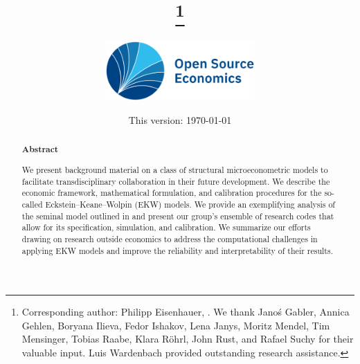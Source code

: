 
\begin{titlepage}

\title{%
	\sffamily\bfseries%
	\papertitle%
	\thanks{Corresponding author: Philipp Eisenhauer, . We thank Jano\'s Gabler, Annica Gehlen, Boryana Ilieva, Fedor Ishakov, Lena Janys, Moritz Mendel, Tim Mensinger, Tobias Raabe, Klara R\"ohrl, John Rust, and Rafael Suchy for their valuable input. Luis Wardenbach provided outstanding research assistance.}
}

\author{%
	\bigskip%
	\includegraphics[height=2.25cm]{../material/OSE_logo_RGB.pdf}%
	\bigskip%
}

\date{%
	\normalsize%
	This version: \today%
}


\maketitle

\begin{abstract}
\begin{center}\textsf{\textbf{Abstract}}\end{center}\medskip
\noindent We present background material on a class of structural microeconometric models to facilitate transdisciplinary collaboration in their future development. We describe the economic framework, mathematical formulation, and calibration procedures for the so-called Eckstein--Keane--Wolpin (EKW) models. We provide an exemplifying analysis of the seminal model outlined in \citet{Keane.1997} and present our group's ensemble of research codes that allow for its specification, simulation, and calibration. We summarize our efforts drawing on research outside economics to
address the computational challenges in applying EKW models and improve the reliability and interpretability of their results.
\end{abstract}


\thispagestyle{empty}

\end{titlepage}

\setcounter{page}{2}

\tableofcontents

\clearpage
